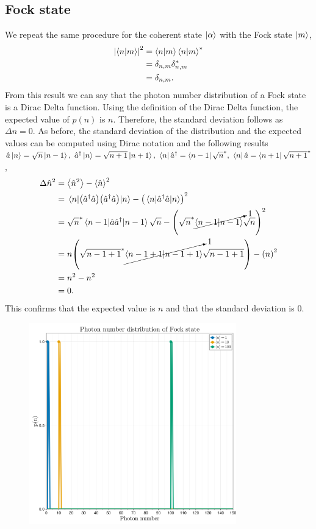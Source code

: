 \documentclass[../main.tex]{subfiles}
\begin{document}
\subsection{Fock state}

We repeat the same procedure for the coherent state $\ket{\alpha}$ with the Fock state $\ket{m}$,
\begin{align*}
    \abs{\braket{n}{m}}^2 &= \braket{n}{m}\braket{n}{m}^* \\
    &= \delta_{n,m}\delta_{n,m}^* \\
    &= \delta_{n,m}.
\end{align*}
From this result we can say that the photon number distribution of a Fock state is a Dirac Delta function.
Using the definition of the Dirac Delta function, the expected value of $p(n)$ is $n$.
Therefore, the standard deviation follows as $\Delta n = 0$.
As before, the standard deviation of the distribution and the expected values can be computed using Dirac notation and the following results $\hat{a}\ket{n}=\sqrt{n}\ket{n-1},~\hat{a}^\dagger\ket{n}=\sqrt{n+1}\ket{n+1},~\bra{n}\hat{a}^\dagger=\bra{n-1}\sqrt{n}^*,~\bra{n}\hat{a}=\bra{n+1}\sqrt{n+1}^*$,
\begin{align*}
    \Delta\hat{n}^2 &= \expval{\hat{n}^2} - \expval{\hat{n}}^2 \\ 
                    &= \expval{\qty(\hat{a}^\dagger\hat{a})\qty(\hat{a}^\dagger\hat{a})}{n} - \qty(\expval{\hat{a}^\dagger\hat{a}}{n})^2 \\
                    &= \sqrt{n}^*\expval{\hat{a}\hat{a}^\dagger}{n-1}\sqrt{n} - \qty(\sqrt{n}^*\cancelto{1}{\braket{n-1}}\sqrt{n})^2 \\
                    &= n\qty(\sqrt{n-1+1}^*\cancelto{1}{\braket{n-1+1}}\sqrt{n-1+1}) - \qty(n)^2 \\
                    &= n^2 - n^2 \\
                    &= 0.
\end{align*}
This confirms that the expected value is $n$ and that the standard deviation is $0.$

\begin{figure}[ht!]
    \centering
    \includegraphics[width=0.8\textwidth]{imgs/fig_fock.png}
\end{figure}
\end{document}
